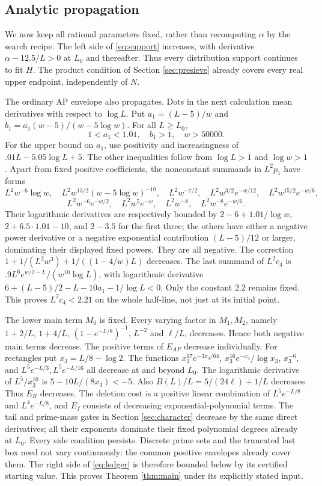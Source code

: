 \documentclass[11pt]{article}
\theoremstyle{remark}\newtheorem{remark}[theorem]{Remark}
\begin{document}
\subsection{Analytic propagation}\label{sec:halfline}
We now keep all rational parameters fixed, rather than recomputing
$\alpha$ by the search recipe. The left side of \eqref{eq:support}
increases, with derivative $\alpha-12.5/L>0$ at $L_0$ and thereafter.
Thus every distribution support continues to fit $H$.
The product condition of Section \ref{sec:presieve} already covers every
real upper endpoint, independently of $N$.

The ordinary AP envelope also propagates. Dots in the next calculation
mean derivatives with respect to $\log L$. Put
$a_1=(L-5)/w$ and $b_1=a_1(w-5)/(w-5\log w)$.
For all $L\ge L_0$,
\[
1<a_1<1.01,\quad b_1>1,\quad w>50000.
\]
For the upper bound on $a_1$, use positivity and increasingness of
$.01L-5.05\log L+5$. The other inequalities follow from $\log L>1$
and $\log w>1$.
Apart from fixed positive coefficients, the nonconstant summands in
$L^2p_1$ have forms
\[
L^2w^{-6}\log w,\quad L^2w^{13/2}(w-5\log w)^{-10},\quad
L^2w^{-7/2},\quad L^2w^{3/2}e^{-w/12},\quad
L^2w^{15/2}e^{-w/6},
\]
\[
L^2w^{-6}e^{-w/2},\quad L^2w^5e^{-w},\quad
L^2w^{-8},\quad L^2w^{-8}e^{-w/6}.
\]
Their logarithmic derivatives are respectively bounded by
$2-6+1.01/\log w$, $2+6.5\cdot1.01-10$, and $2-3.5$ for the
first three; the others have either a negative power derivative or
a negative exponential contribution $(L-5)/12$ or larger, dominating
their displayed fixed powers. They are all negative.
The correction $1+1/(L^2w^3)+1/((1-4/w)L)$ decreases.
The last summand of $L^2c_4$ is
$.9L^6e^{w/2-L}/(w^{10}\log L)$, with logarithmic derivative
$6+(L-5)/2-L-10a_1-1/\log L<0$.
Only the constant $2.2$ remains fixed. This proves $L^2c_4<2.21$
on the whole half-line, not just at its initial point.

The lower main term $M_0$ is fixed. Every varying factor in $M_1,M_2$,
namely $1+2/L$, $1+4/L$, $(1-e^{-L/8})^{-1}$, $L^{-2}$ and $\ell/L$,
decreases. Hence both negative main terms decrease.
The positive terms of $E_{AP}$ decrease individually.
For rectangles put $x_3=L/8-\log2$.
The functions $x_3^{17}e^{-3x_3/64}$,
$x_3^{16}e^{-x_3}/\log x_3$, $x_3^{-6}$, and
$L^5e^{-L/3},L^5e^{-L/16}$ all decrease at and beyond $L_0$.
The logarithmic derivative of $L^5/x_3^{10}$ is
$5-10L/(8x_3)<-5$. Also $B(L)/L=5/(24\ell)+1/L$ decreases.
Thus $E_R$ decreases. The deletion cost is a positive linear combination
of $L^5e^{-L/8}$ and $L^4e^{-L/8}$, and $E_f$ consists of decreasing
exponential-polynomial terms.
The tail and prime-mass gates in Section \ref{sec:character} decrease
by the same direct derivatives; all their exponents dominate their
fixed polynomial degrees already at $L_0$.
Every side condition persists. Discrete prime sets and the truncated
last box need not vary continuously: the common positive envelopes
already cover them. The right side of \eqref{eq:ledger} is therefore
bounded below by its certified starting value.
This proves Theorem \ref{thm:main} under its explicitly stated input.
\end{document}
